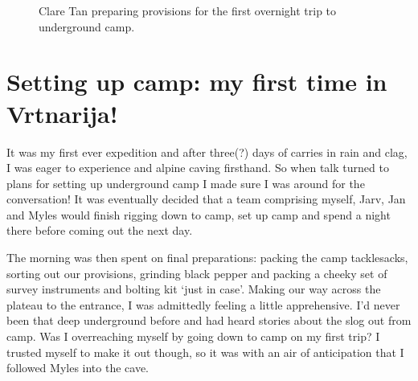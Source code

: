 \begin{figure}[t!]
\checkoddpage \ifoddpage \forcerectofloat \else \forceversofloat \fi
{}
\caption{Clare Tan preparing provisions for the first overnight trip to underground camp. } \label{ug camp pack}
\end{figure}



\section{Setting up camp: my first time in Vrtnarija!}


It was my first ever expedition and after three(?) days of carries in
rain and clag, I was eager to experience  and alpine
caving firsthand. So when talk turned to plans for setting up
underground camp I made sure I was around for the conversation! It was
eventually decided that a team comprising myself, Jarv, Jan and Myles
would finish rigging down to camp, set up camp and spend a night there
before coming out the next day.

The morning was then spent on final preparations: packing the camp
tacklesacks, sorting out our provisions, grinding black pepper and
packing a cheeky set of survey instruments and bolting kit `just in
case'. Making our way across the plateau to the entrance, I was
admittedly feeling a little apprehensive. I'd never been that deep
underground before and had heard stories about the slog out from camp.
Was I overreaching myself by going down to camp on my first trip? I
trusted myself to make it out though, so it was with an air of
anticipation that I followed Myles into the cave.


